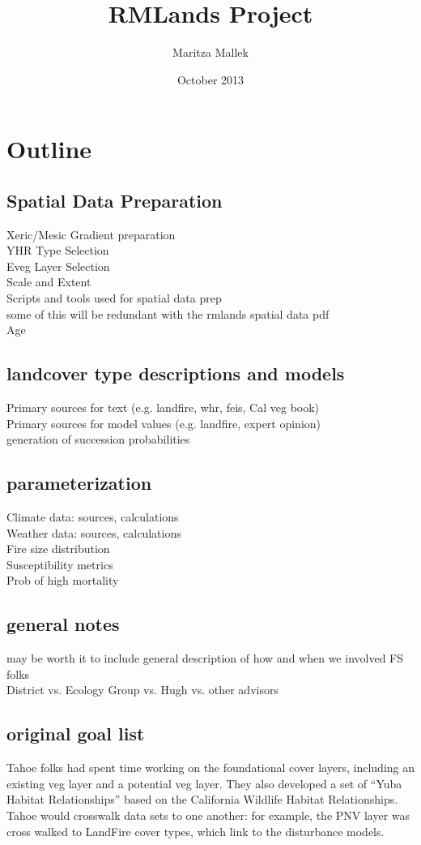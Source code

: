 \documentclass{book}
\begin{document}
\author{Maritza Mallek}
\title{RMLands Project}
\date{October 2013}

\section{Outline}
\subsection{Spatial Data Preparation}
Xeric/Mesic Gradient preparation\\
YHR Type Selection\\
Eveg Layer Selection\\
Scale and Extent\\
Scripts and tools used for spatial data prep\\
some of this will be redundant with the rmlands spatial data pdf\\
Age

\subsection{landcover type descriptions and models}
Primary sources for text (e.g. landfire, whr, feis, Cal veg book)\\
Primary sources for model values (e.g. landfire, expert opinion)\\
generation of succession probabilities\\

\subsection{parameterization}
Climate data: sources, calculations\\
Weather data: sources, calculations\\
Fire size distribution\\
Susceptibility metrics\\
Prob of high mortality\\

\subsection{general notes}
may be worth it to include general description of how and when we involved FS folks\\
District vs. Ecology Group vs. Hugh vs. other advisors\\

\subsection{original goal list}
Tahoe folks had spent time working on the foundational cover layers, including an existing veg layer and a potential veg layer. They also developed a set of ``Yuba Habitat Relationships'' based on the California Wildlife Habitat Relationships. Tahoe would crosswalk data sets to one another: for example, the PNV layer was cross walked to LandFire cover types, which link to the disturbance models.
\end{document}
